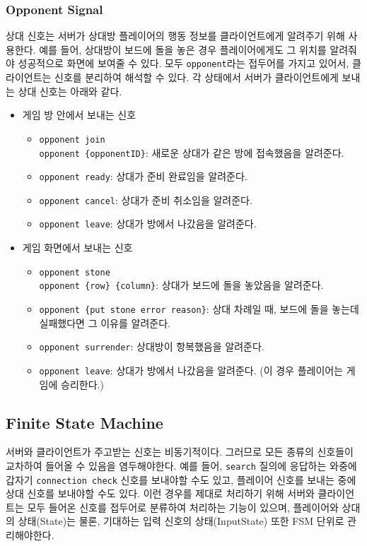 \documentclass[a4paper, 10pt]{article}
\begin{document}
\subsubsection{Opponent Signal}
상대 신호는 서버가 상대방 플레이어의 행동 정보를 클라이언트에게 알려주기 위해
사용한다. 예를 들어, 상대방이 보드에 돌을 놓은 경우 플레이어에게도 그 위치를
알려줘야 성공적으로 화면에 보여줄 수 있다. 모두 \texttt{opponent}라는 접두어를
가지고 있어서, 클라이언트는 신호를 분리하여 해석할 수 있다.
각 상태에서 서버가 클라이언트에게 보내는 상대 신호는 아래와 같다.
\begin{itemize}
  \item 게임 방 안에서 보내는 신호
  \begin{itemize}
    \item \texttt{opponent join\\opponent \{opponentID\}}: 새로운 상대가 같은 방에 접속했음을 알려준다.
    \item \texttt{opponent ready}: 상대가 준비 완료임을 알려준다.
    \item \texttt{opponent cancel}: 상대가 준비 취소임을 알려준다.
    \item \texttt{opponent leave}: 상대가 방에서 나갔음을 알려준다.
  \end{itemize}
  \item 게임 화면에서 보내는 신호
  \begin{itemize}
    \item \texttt{opponent stone\\opponent \{row\} \{column\}}: 상대가 보드에 돌을 놓았음을 알려준다.
    \item \texttt{opponent \{put stone error reason\}}: 상대 차례일 때, 보드에 돌을 놓는데 실패했다면 그 이유를 알려준다.
    \item \texttt{opponent surrender}: 상대방이 항복했음을 알려준다.
    \item \texttt{opponent leave}: 상대가 방에서 나갔음을 알려준다. (이 경우 플레이어는 게임에 승리한다.)
  \end{itemize}
\end{itemize}
\newpage

\subsection{Finite State Machine}
서버와 클라이언트가 주고받는 신호는 비동기적이다. 그러므로 모든 종류의 신호들이
교차하여 들어올 수 있음을 염두해야한다. 예를 들어, \texttt{search} 질의에
응답하는 와중에 갑자기 \texttt{connection check} 신호를 보내야할 수도 있고,
플레이어 신호를 보내는 중에 상대 신호를 보내야할 수도 있다. 이런 경우를 제대로
처리하기 위해 서버와 클라이언트는 모두 들어온 신호를 접두어로 분류하여 처리하는
기능이 있으며, 플레이어와 상대의 상태(State)는 물론, 기대하는 입력 신호의
상태(InputState) 또한 FSM 단위로 관리해야한다.
\end{document}
